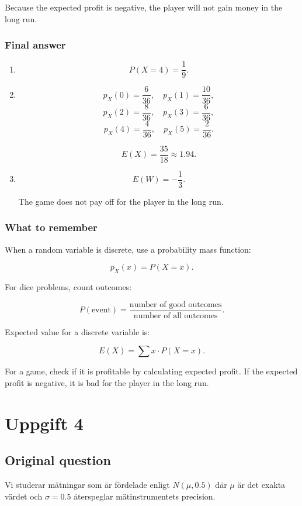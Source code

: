 \documentclass[10pt]{article}
\begin{document}
Because the expected profit is negative, the player will not gain money
in the long run.

\subsubsection*{Final answer}
\begin{enumerate}[label=\alph*)]
\item
\[
P(X=4)=\frac{1}{9}.
\]

\item
\[
p_X(0)=\frac{6}{36},
\quad
p_X(1)=\frac{10}{36},
\]
\[
p_X(2)=\frac{8}{36},
\quad
p_X(3)=\frac{6}{36},
\]
\[
p_X(4)=\frac{4}{36},
\quad
p_X(5)=\frac{2}{36}.
\]

\[
E(X)=\frac{35}{18}\approx 1.94.
\]

\item
\[
E(W)=-\frac{1}{3}.
\]

The game does not pay off for the player in the long run.
\end{enumerate}

\subsubsection*{What to remember}
When a random variable is discrete, use a probability mass function:

\[
p_X(x)=P(X=x).
\]

For dice problems, count outcomes:

\[
P(\text{event})
=
\frac{\text{number of good outcomes}}
{\text{number of all outcomes}}.
\]

Expected value for a discrete variable is:

\[
E(X)=\sum x\cdot P(X=x).
\]

For a game, check if it is profitable by calculating expected profit.
If the expected profit is negative, it is bad for the player in the long run.

\section*{Uppgift 4}

\subsection*{Original question}

Vi studerar mätningar som är fördelade enligt
\(N(\mu,0.5)\) där \(\mu\) är det exakta värdet
och \(\sigma = 0.5\) återspeglar mätinstrumentets
precision.
\end{document}

